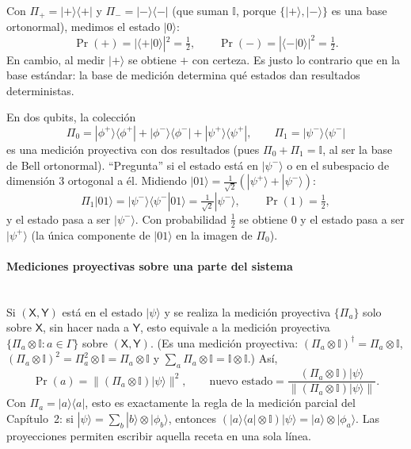 \documentclass[11pt, a4paper, twoside, openright]{report}
\begin{document}
\begin{tcolorbox}[colback=cyan!5!white,colframe=cyan!75!black,title=\textbf{Ejemplo: Medir en la base $\{|+\rangle,|-\rangle\}$}]
Con $\Pi_+ = |+\rangle\langle+|$ y $\Pi_- = |-\rangle\langle-|$ (que suman $\mathbb{I}$, porque $\{|+\rangle,|-\rangle\}$ es una base ortonormal), medimos el estado $|0\rangle$:
\[ \Pr(+) = |\langle+|0\rangle|^2 = \tfrac12, \qquad \Pr(-) = |\langle-|0\rangle|^2 = \tfrac12. \]
En cambio, al medir $|+\rangle$ se obtiene $+$ con certeza. Es justo lo contrario que en la base estándar: la base de medición determina qué estados dan resultados deterministas.
\end{tcolorbox}

\begin{tcolorbox}[colback=cyan!5!white,colframe=cyan!75!black,title=\textbf{Ejemplo: Una medición que no es una base}]
En dos qubits, la colección
\[ \Pi_0 = |\phi^+\rangle\langle\phi^+| + |\phi^-\rangle\langle\phi^-| + |\psi^+\rangle\langle\psi^+|, \qquad \Pi_1 = |\psi^-\rangle\langle\psi^-| \]
es una medición proyectiva con dos resultados (pues $\Pi_0 + \Pi_1 = \mathbb{I}$, al ser la base de Bell ortonormal). ``Pregunta'' si el estado está en $|\psi^-\rangle$ o en el subespacio de dimensión $3$ ortogonal a él. Midiendo $|01\rangle = \frac{1}{\sqrt2}(|\psi^+\rangle + |\psi^-\rangle)$:
\[ \Pi_1|01\rangle = |\psi^-\rangle\langle\psi^-|01\rangle = \tfrac{1}{\sqrt2}|\psi^-\rangle, \qquad \Pr(1) = \tfrac12, \]
y el estado pasa a ser $|\psi^-\rangle$. Con probabilidad $\frac12$ se obtiene $0$ y el estado pasa a ser $|\psi^+\rangle$ (la única componente de $|01\rangle$ en la imagen de $\Pi_0$).
\end{tcolorbox}

\paragraph{Mediciones proyectivas sobre una parte del sistema}\mbox{}\\

\noindent Si $(\mathsf{X},\mathsf{Y})$ está en el estado $|\psi\rangle$ y se realiza la medición proyectiva $\{\Pi_a\}$ solo sobre $\mathsf{X}$, sin hacer nada a $\mathsf{Y}$, esto equivale a la medición proyectiva $\{\Pi_a\otimes\mathbb{I}: a\in\Gamma\}$ sobre $(\mathsf{X},\mathsf{Y})$. (Es una medición proyectiva: $(\Pi_a\otimes\mathbb{I})^\dagger = \Pi_a\otimes\mathbb{I}$, $(\Pi_a\otimes\mathbb{I})^2 = \Pi_a^2\otimes\mathbb{I} = \Pi_a\otimes\mathbb{I}$ y $\sum_a\Pi_a\otimes\mathbb{I} = \mathbb{I}\otimes\mathbb{I}$.) Así,
\[ \Pr(a) = \|(\Pi_a\otimes\mathbb{I})|\psi\rangle\|^2, \qquad \text{nuevo estado} = \frac{(\Pi_a\otimes\mathbb{I})|\psi\rangle}{\|(\Pi_a\otimes\mathbb{I})|\psi\rangle\|}. \]
Con $\Pi_a = |a\rangle\langle a|$, esto es exactamente la regla de la medición parcial del Capítulo~2: si $|\psi\rangle = \sum_b|b\rangle\otimes|\phi_b\rangle$, entonces $(|a\rangle\langle a|\otimes\mathbb{I})|\psi\rangle = |a\rangle\otimes|\phi_a\rangle$. Las proyecciones permiten escribir aquella receta en una sola línea.
\end{document}
